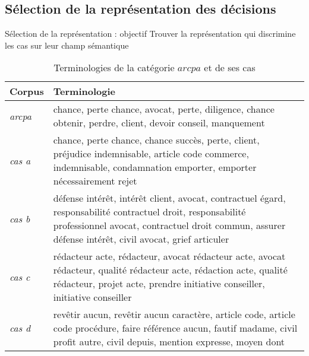 \subsection{Sélection de la représentation des décisions}
\begin{frame}{Sélection de la représentation : objectif}
	Trouver la représentation qui discrimine les cas sur leur champ sémantique
	
	\begin{table}[ht]
		\scriptsize
		\begin{center}
			\begin{tabular}{|l|p{}|}
				\hline
				\textbf{Corpus} & \textbf{Terminologie} \\ \hline
				\textit{arcpa} & chance, perte chance, avocat, perte, diligence, chance obtenir, perdre, client, devoir conseil, manquement
				\\ \hline
				\textit{cas a} & chance, perte chance, chance succès, perte, client, préjudice indemnisable, article code commerce, indemnisable, condamnation emporter, emporter nécessairement rejet
				\\ \hline
				\textit{cas b} & défense intérêt, intérêt client, avocat, contractuel égard, responsabilité contractuel droit, responsabilité professionnel avocat, contractuel droit commun, assurer défense intérêt, civil avocat, grief articuler
				\\ \hline
				\textit{cas c} & rédacteur acte, rédacteur, avocat rédacteur acte, avocat rédacteur, qualité rédacteur acte, rédaction acte, qualité rédacteur, projet acte, prendre initiative conseiller, initiative conseiller
				\\ \hline
				\textit{cas d} & revêtir aucun, revêtir aucun caractère, article code, article code procédure, faire référence aucun, fautif madame, civil profit autre, civil depuis, mention expresse, moyen dont
				\\ \hline
			\end{tabular}
		\end{center}
		\caption{Terminologies de  la catégorie  $arcpa$ et de ses cas}
	\end{table}
\end{frame}
